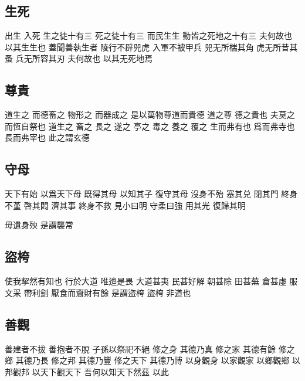 \documentclass[a5paper,zihao=-4,oneside,UTF8]{ctexart}
\begin{document}
\subsection{生死}



出生 入死 
生之徒十有三 死之徒十有三 而民生生 動皆之死地之十有三 
夫何故也 以其生生也 
蓋聞善執生者 陵行不辟兕虎 入軍不被甲兵 兕无所椯其角 虎无所昔其蚤 兵无所容其刃 
夫何故也 以其无死地焉




\subsection{尊貴}



道生之 而德畜之 物形之 而器成之 
是以萬物尊道而貴德 
道之尊 德之貴也 夫莫之而恆自祭也 
道生之 畜之 長之 遂之 亭之 毒之 養之 覆之 
生而弗有也 爲而弗寺也 長而弗宰也 此之謂玄德 



\subsection{守母}



天下有始 以爲天下母 
既得其母 以知其子 復守其母 沒身不殆 
塞其兑 閉其門 終身不堇 
啓其悶 濟其事 終身不救 
見小曰明 守柔曰強 
用其光 復歸其明

毋遺身殃 是謂襲常




\subsection{盜桍}



使我挈然有知也 行於大道 唯迆是畏 
大道甚夷 民甚好解 
朝甚除 田甚蕪 倉甚虛 服文采 帶利劍 厭食而齎財有餘 是謂盜桍 
盜桍 非道也




\subsection{善觀}



善建者不拔 善抱者不脫 子孫以祭祀不絕 
修之身 其德乃真 修之家 其德有餘 修之鄉 其德乃長 修之邦 其德乃豐 修之天下 其德乃博 
以身觀身 以家觀家 以鄉觀鄉 以邦觀邦 以天下觀天下 
吾何以知天下然茲 以此 
\end{document}
